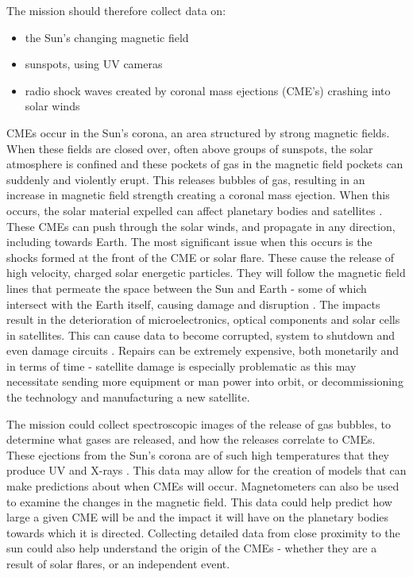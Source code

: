 \documentclass[12pt]{article}
\begin{document}
The mission should therefore collect data on:

\begin{itemize}
    \item the Sun's changing magnetic field
    \item sunspots, using UV cameras
    \item radio shock waves created by coronal mass ejections (CME's) crashing into solar winds
\end{itemize}

CMEs occur in the Sun's corona, an area structured by strong magnetic fields. When these fields are closed over, often above groups of sunspots, the solar atmosphere is confined and these pockets of gas in the magnetic field pockets can suddenly and violently erupt. This releases bubbles of gas, resulting in an increase in magnetic field strength creating a coronal mass ejection. When this occurs, the solar material expelled can affect planetary bodies and satellites \cite{sundata}. These CMEs can push through the solar winds, and propagate in any direction, including towards Earth. The most significant issue when this occurs is the shocks formed at the front of the CME or solar flare. These cause the release of high velocity, charged solar energetic particles. They will follow the magnetic field lines that permeate the space between the Sun and Earth - some of which intersect with the Earth itself, causing damage and disruption \cite{spacweather}. The impacts result in the deterioration of microelectronics, optical components and solar cells in satellites. This can cause data to become corrupted, system to shutdown and even damage circuits \cite{seps}. Repairs can be extremely expensive, both monetarily and in terms of time - satellite damage is especially problematic as this may necessitate sending more equipment or man power into orbit, or decommissioning the technology and manufacturing a new satellite. 

\bigskip

The mission could collect spectroscopic images of the release of gas bubbles, to determine what gases are released, and how the releases correlate to CMEs. These ejections from the Sun’s corona are of such high temperatures that they produce UV and X-rays \cite{sundata}. This data may allow for the creation of models that can make predictions about when CMEs will occur. Magnetometers can also be used to examine the changes in the magnetic field. This data could help predict how large a given CME will be and the impact it will have on the planetary bodies towards which it is directed. Collecting detailed data from close proximity to the sun could also help understand the origin of the CMEs - whether they are a result of solar flares, or an independent event.
\end{document}
